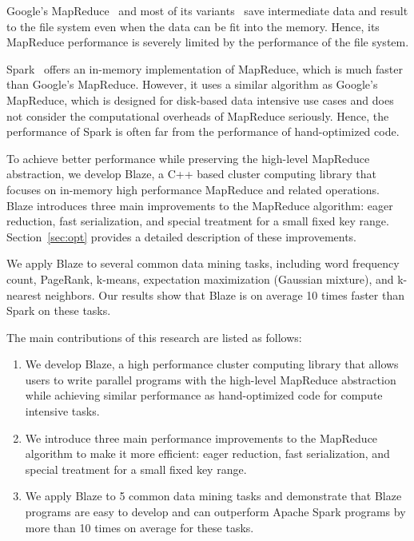Google's MapReduce~\cite{dean2008mapreduce,dean2010mapreduce} and most of its variants~\cite{hadoop,chambers2010flumejava,cascading,afrati2010optimizing,bhatotia2011incoop,condie2010mapreduce,ekanayake2010twister,goiri2015approxhadoop,he2008mars,li2015coded,zaharia2008improving,yang2007map} save intermediate data and result to the file system even when the data can be fit into the memory.
Hence, its MapReduce performance is severely limited by the performance of the file system.

Spark~\cite{spark, zaharia2010spark, zaharia2016apache, zaharia2012resilient} offers an in-memory implementation of MapReduce, which is much faster than Google's MapReduce.
However, it uses a similar algorithm as Google's MapReduce, which is designed for disk-based data intensive use cases and does not consider the computational overheads of MapReduce seriously.
Hence, the performance of Spark is often far from the performance of hand-optimized code.

To achieve better performance while preserving the high-level MapReduce abstraction, we develop Blaze, a C++ based cluster computing library that focuses on in-memory high performance MapReduce and related operations.
Blaze introduces three main improvements to the MapReduce algorithm: eager reduction, fast serialization, and special treatment for a small fixed key range.
Section~\ref{sec:opt} provides a detailed description of these improvements.

We apply Blaze to several common data mining tasks, including word frequency count, PageRank, k-means, expectation maximization (Gaussian mixture), and k-nearest neighbors.
Our results show that Blaze is on average 10 times faster than Spark on these tasks.

The main contributions of this research are listed as follows:
\begin{enumerate}
    \item We develop Blaze, a high performance cluster computing library that allows users to write parallel programs with the high-level MapReduce abstraction while achieving similar performance as hand-optimized code for compute intensive tasks.
    \item We introduce three main performance improvements to the MapReduce algorithm to make it more efficient: eager reduction, fast serialization, and special treatment for a small fixed key range.
    \item We apply Blaze to 5 common data mining tasks and demonstrate that Blaze programs are easy to develop and can outperform Apache Spark programs by more than 10 times on average for these tasks.
\end{enumerate}

